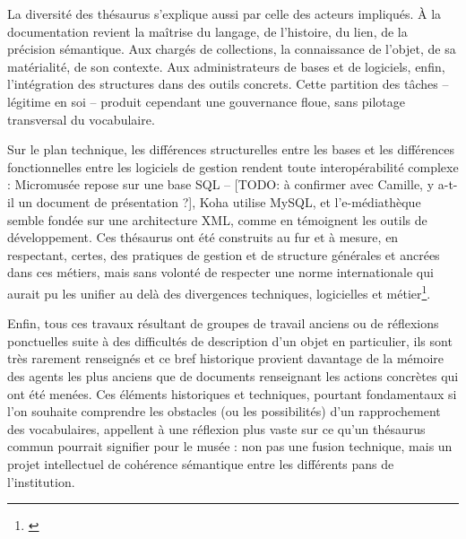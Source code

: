 La diversité des thésaurus s’explique aussi par celle des acteurs impliqués. À la documentation revient la maîtrise du langage, de l'histoire, du lien, de la précision sémantique. Aux chargés de collections, la connaissance de l’objet, de sa matérialité, de son contexte. Aux administrateurs de bases et de logiciels, enfin, l’intégration des structures dans des outils concrets. Cette partition des tâches – légitime en soi – produit cependant une gouvernance floue, sans pilotage transversal du vocabulaire.

Sur le plan technique, les différences structurelles entre les bases et les différences fonctionnelles entre les logiciels de gestion rendent toute interopérabilité complexe : Micromusée repose sur une base SQL – [TODO: à confirmer avec Camille, y a-t-il un document de présentation ?], Koha utilise MySQL, et l’e-médiathèque semble fondée sur une architecture XML, comme en témoignent les outils de développement. Ces thésaurus ont été construits au fur et à mesure, en respectant, certes, des pratiques de gestion et de structure générales et ancrées dans ces métiers, mais sans volonté de respecter une norme internationale qui aurait pu les unifier au delà des divergences techniques, logicielles et métier\footnote{\cite{chichereauNormesConceptionGestion2007}}. 

Enfin, tous ces travaux résultant de groupes de travail anciens ou de réflexions ponctuelles suite à des difficultés de description d'un objet en particulier, ils sont très rarement renseignés et ce bref historique provient davantage de la mémoire des agents les plus anciens que de documents renseignant les actions concrètes qui ont été menées. Ces éléments historiques et techniques, pourtant fondamentaux si l’on souhaite comprendre les obstacles (ou les possibilités) d’un rapprochement des vocabulaires, appellent à une réflexion plus vaste sur ce qu’un thésaurus commun pourrait signifier pour le musée : non pas une fusion technique, mais un projet intellectuel de cohérence sémantique entre les différents pans de l’institution.